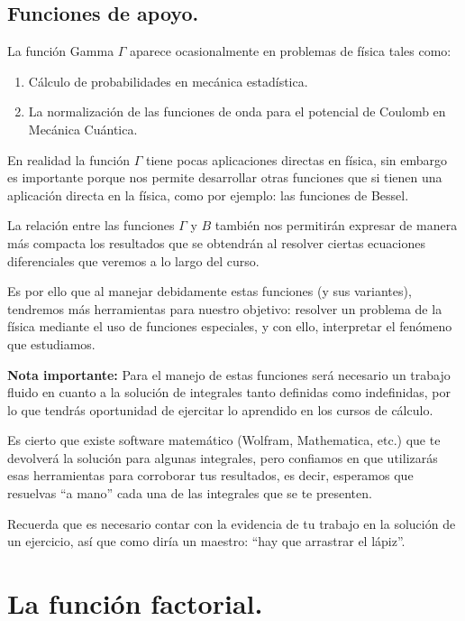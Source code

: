 \subsection{Funciones de apoyo.}
La función Gamma $\Gamma$ aparece ocasionalmente en problemas de física tales como:
\begin{enumerate}
\item Cálculo de probabilidades en mecánica estadística.
\item La normalización de las funciones de onda para el potencial de Coulomb en Mecánica Cuántica.
\end{enumerate}
En realidad la función $\Gamma$ tiene pocas aplicaciones directas en física, sin embargo es importante porque nos permite desarrollar otras funciones que si tienen una aplicación directa en la física, como por ejemplo: las funciones de Bessel.
\par
La relación entre las funciones $\Gamma$ y $B$ también nos permitirán expresar de manera más compacta los resultados que se obtendrán al resolver ciertas ecuaciones diferenciales que veremos a lo largo del curso.
\par
Es por ello que al manejar debidamente estas funciones (y sus variantes), tendremos más herramientas para nuestro objetivo: resolver un problema de la física mediante el uso de funciones especiales, y con ello, interpretar el fenómeno que estudiamos.
\par
\textbf{Nota importante: }Para el manejo de estas funciones será necesario un trabajo fluido en cuanto a la solución de integrales tanto definidas como indefinidas, por lo que tendrás oportunidad de ejercitar lo aprendido en los cursos de cálculo.
\par
Es cierto que existe software matemático (Wolfram, Mathematica, etc.) que te devolverá la solución para algunas integrales, pero confiamos en que utilizarás esas herramientas para corroborar tus resultados, es decir, esperamos que resuelvas \enquote{a mano} cada una de las integrales que se te presenten.
\par
Recuerda que es necesario contar con la evidencia de tu trabajo en la solución de un ejercicio, así que como diría un maestro: \enquote{hay que arrastrar el lápiz}.
\section{La función factorial.}
